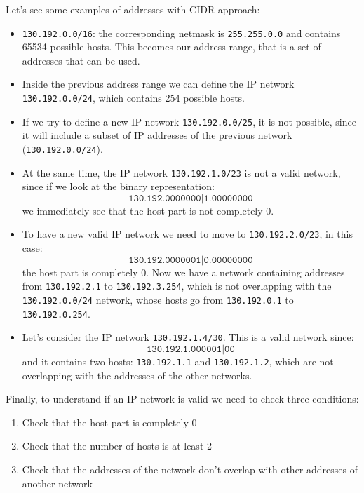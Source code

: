Let's see some examples of addresses with CIDR approach:
\begin{itemize}
    \item \texttt{130.192.0.0/16}: the corresponding netmask is \texttt{255.255.0.0} and contains 65534 possible hosts. This becomes our address range, that is a set of addresses that can be used.
    \item Inside the previous address range we can define the IP network \texttt{130.192.0.0/24}, which contains 254 possible hosts.
    \item If we try to define a new IP network \texttt{130.192.0.0/25}, it is not possible, since it will include a subset of IP addresses of the previous network (\texttt{130.192.0.0/24}).
    \item At the same time, the IP network \texttt{130.192.1.0/23} is not a valid network, since if we look at the binary representation:
    \[\texttt{130.192.0000000|1.00000000}\]
    we immediately see that the host part is not completely 0.
    \item To have a new valid IP network we need to move to \texttt{130.192.2.0/23}, in this case:
    \[\texttt{130.192.0000001|0.00000000}\]
    the host part is completely 0. Now we have a network containing addresses from \texttt{130.192.2.1} to \texttt{130.192.3.254}, which is not overlapping with the \texttt{130.192.0.0/24} network, whose hosts go from \texttt{130.192.0.1} to \texttt{130.192.0.254}.
    \item Let's consider the IP network \texttt{130.192.1.4/30}. This is a valid network since:
    \[\texttt{130.192.1.000001|00}\]
    and it contains two hosts: \texttt{130.192.1.1} and \texttt{130.192.1.2}, which are not overlapping with the addresses of the other networks.
\end{itemize}

\noindent Finally, to understand if an IP network is valid we need to check three conditions:
\begin{enumerate}
    \item Check that the host part is completely 0
    \item Check that the number of hosts is at least 2
    \item Check that the addresses of the network don't overlap with other addresses of another network
\end{enumerate}

